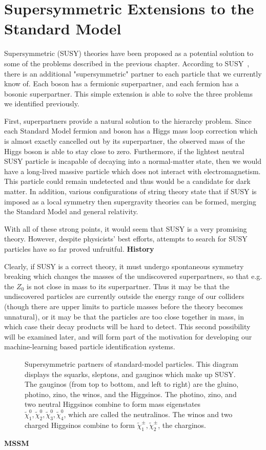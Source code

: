 \chapter{Supersymmetric Extensions to the Standard Model}

Supersymmetric (SUSY) theories have been proposed as a potential solution to some of the problems described in the previous chapter. According to SUSY~\cite{SUSY_primer}, there is an additional "supersymmetric" partner to each particle that we currently know of. Each boson has a fermionic superpartner, and each fermion has a bosonic superpartner. This simple extension is able to solve the three problems we identified previously.

First, superpartners provide a natural solution to the hierarchy problem. Since each Standard Model fermion and boson has a Higgs mass loop correction which is almost exactly cancelled out by its superpartner, the observed mass of the Higgs boson is able to stay close to zero. Furthermore, if the lightest neutral SUSY particle is incapable of decaying into a normal-matter state, then we would have a long-lived massive particle which does not interact with electromagnetism. This particle could remain undetected and thus would be a candidate for dark matter. In addition, various configurations of string theory state that if SUSY is imposed as a local symmetry then supergravity theories can be formed, merging the Standard Model and general relativity.

With all of these strong points, it would seem that SUSY is a very promising theory. However, despite physicists' best efforts, attempts to search for SUSY particles have so far proved unfruitful. \textbf{History}

Clearly, if SUSY is a correct theory, it must undergo spontaneous symmetry breaking which changes the masses of the undiscovered superpartners, so that e.g. the \textbf{$Z_0$} is not close in mass to its superpartner. Thus it may be that the undiscovered particles are currently outside the energy range of our colliders (though there are upper limits to particle masses before the theory becomes unnatural), or it may be that the particles are too close together in mass, in which case their decay products will be hard to detect. This second possibility will be examined later, and will form part of the motivation for developing our machine-learning based particle identification systems.

\begin{figure}[htbp]
    \centering
    \caption{Supersymmetric partners of standard-model particles. This diagram displays the squarks, sleptons, and gauginos which make up SUSY. The gauginos (from top to bottom, and left to right) are the gluino, photino, zino, the winos, and the Higgsinos. The photino, zino, and two neutral Higgsinos combine to form mass eigenstates $\tilde{\chi}^0_1, \tilde{\chi}^0_2, \tilde{\chi}^0_3, \tilde{\chi}^0_4$, which are called the neutralinos. The winos and two charged Higgsinos combine to form $\tilde{\chi}^\pm_1, \tilde{\chi}^\pm_2$, the charginos.}
    \label{fig:my_label}
\end{figure}

\textbf{MSSM}
